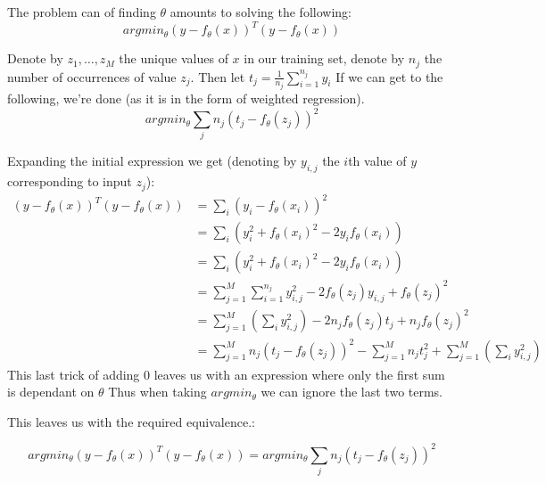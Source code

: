 The problem can of finding $\theta$ amounts to solving the following:
$$argmin_\theta \left(y - f_\theta(x)\right)^T \left(y - f_\theta(x)\right)$$

Denote by $z_1, \dots, z_M$ the unique values of $x$ in our training set, denote by $n_j$ the number of occurrences of value $z_j$. 
Then let $t_j = \frac{1}{n_j}\sum_{i=1}^{n_j} y_i$
If we can get to the following, we're done (as it is in the form of weighted regression). 
$$argmin_\theta \sum_j n_j \left(t_j - f_\theta(z_j)\right)^2$$

Expanding the initial expression we get (denoting by $y_{i,j}$ the $i$th value of $y$ corresponding to input $z_j$):
\begin{align*}
     \left(y - f_\theta(x)\right)^T \left(y - f_\theta(x)\right) &= \sum_i \left(y_i - f_\theta(x_i)\right)^2 \\
    &= \sum_i \left(y_i^2 + f_\theta(x_i)^2 - 2 y_i f_\theta(x_i)\right) \\
    &= \sum_i \left(y_i^2 + f_\theta(x_i)^2 - 2 y_i f_\theta(x_i)\right) \\
    &= \sum_{j=1}^M \sum_{i=1}^{n_j}  y_{i,j}^2 - 2 f_\theta(z_j) y_{i,j} + f_\theta(z_j)^2\\
    &= \sum_{j=1}^M   \left(\sum_i y_{i,j}^2\right) - 2 n_j f_\theta(z_j) t_j + n_j f_\theta(z_j)^2\\
    &= \sum_{j=1}^M   n_j  (t_j -  f_\theta(z_j)) ^ 2 - \sum_{j=1}^M n_j t_j^2 + \sum_{j=1}^M   \left(\sum_i y_{i,j}^2\right) 
\end{align*}
This last trick of adding $0$ leaves us with an expression where only the first sum is dependant on $\theta$
Thus when taking $argmin_\theta$ we can ignore the last two terms.

This leaves us with the required equivalence.:

$$argmin_\theta \left(y - f_\theta(x)\right)^T \left(y - f_\theta(x)\right) = argmin_\theta \sum_j n_j \left(t_j - f_\theta(z_j)\right)^2$$

